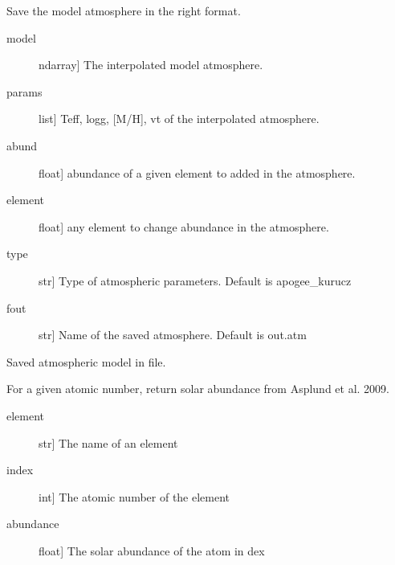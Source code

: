 \documentclass[letterpaper,10pt,english]{sphinxmanual}
\begin{document}
\begin{fulllineitems}
\label{\detokenize{index:FASMA.interpolation.save_model}}
Save the model atmosphere in the right format.
\begin{description}
\item[{model}] \leavevmode{[}ndarray{]}
The interpolated model atmosphere.

\item[{params}] \leavevmode{[}list{]}
Teff, logg, {[}M/H{]}, vt of the interpolated atmosphere.

\item[{abund}] \leavevmode{[}float{]}
abundance of a given element to added in the atmosphere.

\item[{element}] \leavevmode{[}float{]}
any element to change abundance in the atmosphere.

\item[{type}] \leavevmode{[}str{]}
Type of atmospheric parameters. Default is apogee\_kurucz

\item[{fout}] \leavevmode{[}str{]}
Name of the saved atmosphere. Default is out.atm

\end{description}

Saved atmospheric model in file.

\end{fulllineitems}


\begin{fulllineitems}
\label{\detokenize{index:FASMA.interpolation.solar_abundance}}
For a given atomic number, return solar abundance from Asplund et al. 2009.
\begin{description}
\item[{element}] \leavevmode{[}str{]}
The name of an element

\end{description}
\begin{description}
\item[{index}] \leavevmode{[}int{]}
The atomic number of the element

\item[{abundance}] \leavevmode{[}float{]}
The solar abundance of the atom in dex

\end{description}

\end{fulllineitems}
\end{document}
